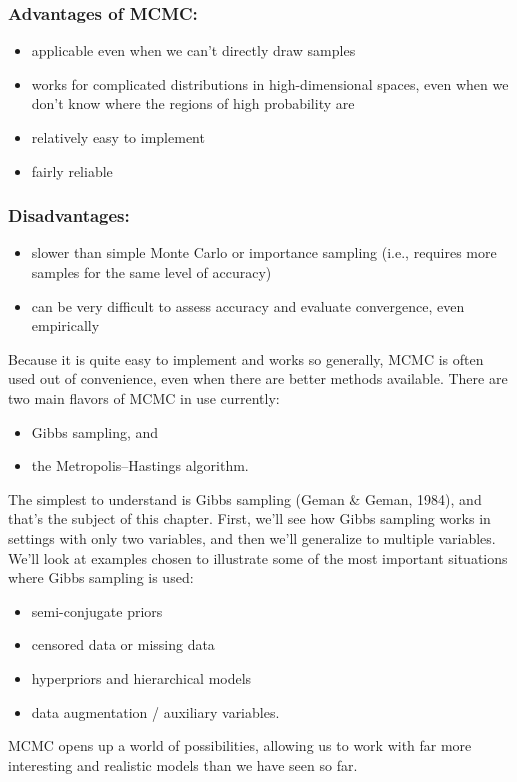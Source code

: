 \documentclass[12pt]{article}
\begin{document}
\subsubsection*{Advantages of MCMC:}
\begin{itemize}
\item applicable even when we can't directly draw samples
\item works for complicated distributions in high-dimensional spaces, even when we don't know where the regions of high probability are
\item relatively easy to implement
\item fairly reliable
\end{itemize}

\subsubsection*{Disadvantages:}
\begin{itemize}
\item slower than simple Monte Carlo or importance sampling (i.e., requires more samples for the same level of accuracy)
\item can be very difficult to assess accuracy and evaluate convergence, even empirically
\end{itemize}

Because it is quite easy to implement and works so generally, MCMC is often used out of convenience, even when there are better methods
available. There are two main flavors of MCMC in use currently:
\begin{itemize}
\item Gibbs sampling, and
\item the Metropolis--Hastings algorithm.
\end{itemize}
The simplest to understand is Gibbs sampling (Geman \& Geman, 1984), and that's the subject of this chapter. First, we'll see how Gibbs sampling works in 
settings with only two variables, and then we'll generalize to multiple variables. We'll look at examples chosen to illustrate some
of the most important situations where Gibbs sampling is used:
\begin{itemize}
    \item semi-conjugate priors
    \item censored data or missing data
    \item hyperpriors and hierarchical models
    \item data augmentation / auxiliary variables.
\end{itemize}
MCMC opens up a world of possibilities, allowing us to work with far more interesting and realistic models than we have seen so far.
\end{document}
